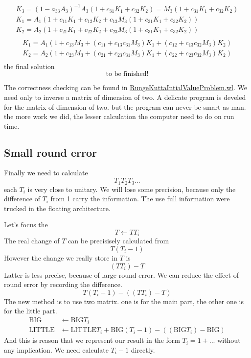 \documentclass[12pt,twoside]{article}
\begin{document}
\begin{align*}
K_3 = (1-a_{33}A_3)^{-1}A_3 (1 + c_{31} K_1 + c_{32} K_2) = M_3 (1 + c_{31} K_1 + c_{32} K_2)\\
K_1 = A_1 (1 + c_{11} K_1 + c_{12} K_2 + c_{13} M_3(1 + c_{31} K_1 + c_{32} K_2))\\
K_2 = A_2 (1 + c_{21} K_1 + c_{22} K_2 + c_{23} M_3(1 + c_{31} K_1 + c_{32} K_2))\\
\end{align*}
\begin{align*}
K_1 = A_1 (1 + c_{13} M_3 + (c_{11} + c_{13} c_{31}M_3) K_1 + (c_{12} + c_{13} c_{32} M_3) K_2)\\
K_2 = A_2 (1 + c_{23} M_3 + (c_{21} + c_{23} c_{31}M_3) K_1 + (c_{22} + c_{23} c_{32} M_3) K_2)\\
\end{align*}
the final solution
$$
\text{to be finished!}
$$

\fi
The correctness checking can be found in \url{RungeKuttaIntialValueProblem.wl}.
We need only to inverse a matrix of dimension of two. A delicate program is develed for the matrix of dimension of two. but the program can never be smart as man. the more work we did, the lesser calculation the computer need to do on run time.
\subsection{Small round error}
Finally we need to calculate
$$
T_1 T_2 T_3 ...
$$
each $T_i$ is very close to unitary. We will lose some precision, because only the difference of $T_i$ from 1 carry the information. The use full information were trucked in the floating architecture.

Let's focus the
$$
T \leftarrow T T_i
$$
The real change of $T$ can be precisisely calculated from
$$
T(T_i - 1)
$$
However the change we really store in $T$ is
$$
(T T_i) - T
$$
Latter is less precise, because of large round error. We can reduce the effect of round error by recording the difference.
$$
T(T_i -1) - ((T T_i) - T)
$$
The new method is to use two matrix. one is for the main part, the other one is for the little part.
\begin{align}
\text{BIG} &\leftarrow \text{BIG} T_i\\
\text{LITTLE} &\leftarrow \text{LITTLE} T_i +  \text{BIG}(T_i -1) - ((\text{BIG} T_i) - \text{BIG})
\end{align}
And this is reason that we represent our result in the form $T_i = 1 + ...$ without any implication. We need calculate $T_i-1$ directly.
\end{document}
